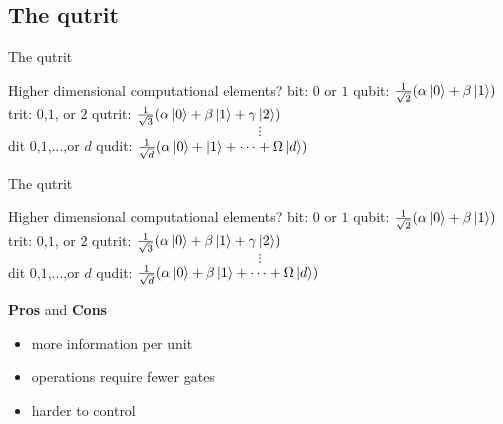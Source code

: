 \documentclass[t]{beamer}
\begin{document}
\subsection{The qutrit}
\begin{frame}{}
\tableofcontents[ 
currentsubsection, 
hideothersubsections, 
sectionstyle=show/shaded, 
subsectionstyle=show/shaded, 
] 
\end{frame}

\begin{frame}{The qutrit}
\begin{block}{Higher dimensional computational elements?}
bit: $0$ or $1$ \hspace{4cm} qubit: $\frac{1}{\sqrt{2}}(\alpha\ket{0} + \beta\ket{1})$
\\
trit: $0$,$1$, or $2$ \hspace{3.5cm} qutrit: $\frac{1}{\sqrt{3}}(\alpha\ket{0} + \beta\ket{1} + \gamma\ket{2})$
\\
$$\mathbf{\vdots} $$
dit $0$,$1$,$\dots$,or $d$ \hspace{3cm} qudit: $\frac{1}{\sqrt{d}}(\alpha\ket{0} + \ket{1} + \dots + \Omega\ket{d})$

\end{block}

\end{frame}


\begin{frame}{The qutrit}
\begin{block}{Higher dimensional computational elements?}
bit: $0$ or $1$ \hspace{4cm} qubit: $\frac{1}{\sqrt{2}}(\alpha\ket{0} + \beta\ket{1})$
\\
trit: $0$,$1$, or $2$ \hspace{3.5cm} qutrit: $\frac{1}{\sqrt{3}}(\alpha\ket{0} + \beta\ket{1} + \gamma\ket{2})$
\\
$$\mathbf{\vdots} $$
dit $0$,$1$,$\dots$,or $d$ \hspace{3cm} qudit: $\frac{1}{\sqrt{d}}(\alpha\ket{0} + \beta\ket{1} + \dots + \Omega\ket{d})$
\end{block}

\begin{block}{\textbf{Pros} and \textbf{Cons}}
\begin{itemize}
\item more information per unit
\item operations require fewer gates 
\item harder to control
\end{itemize}

\end{block}

\end{frame}
\end{document}
